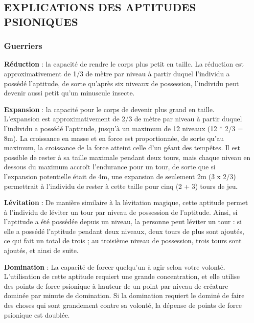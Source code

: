 \documentclass[11pt]{article}
\begin{document}
{\newpage
\subsection*{\normalsize EXPLICATIONS DES APTITUDES PSIONIQUES}

\subsubsection*{Guerriers}

\textbf{Réduction} : la capacité de rendre le corps plus petit en taille. La réduction est approximativement de 1/3 de mètre par niveau à partir duquel l'individu a possédé l'aptitude, de sorte qu'après six niveaux de possession, l'individu peut devenir aussi petit qu'un minuscule insecte.

\bigskip

\textbf{Expansion} : la capacité pour le corps de devenir plus grand en taille. L'expansion est approximativement de 2/3 de mètre par niveau à partir duquel l'individu a possédé l'aptitude, jusqu'à un maximum de 12 niveaux (12 * 2/3 = 8m). La croissance en masse et en force est proportionnée, de sorte qu'au maximum, la croissance de la force atteint celle d'un géant des tempêtes. Il est possible de rester à sa taille maximale pendant deux tours, mais chaque niveau en dessous du maximum accroît l'endurance pour un tour, de sorte que si l'expansion potentielle était de 4m, une expansion de seulement 2m (3 x 2/3) permettrait à l'individu de rester à cette taille pour cinq (2 + 3) tours de jeu.

\bigskip

\textbf{Lévitation} : De manière similaire à la lévitation magique, cette aptitude permet à l'individu de léviter un tour par niveau de possession de l'aptitude. Ainsi, si l'aptitude a été possédée depuis un niveau, la personne peut léviter un tour : si elle a possédé l'aptitude pendant deux niveaux, deux tours de plus sont ajoutés, ce qui fait un total de trois ; au troisième niveau de possession, trois tours sont ajoutés, et ainsi de suite.

\bigskip

\textbf{Domination} : La capacité de forcer quelqu'un à agir selon votre volonté. L'utilisation de cette aptitude requiert une grande concentration, et elle utilise des points de force psionique à hauteur de un point par niveau de créature dominée par minute de domination. Si la domination requiert le dominé de faire des choses qui sont grandement contre sa volonté, la dépense de points de force psionique est doublée.

}
\end{document}
